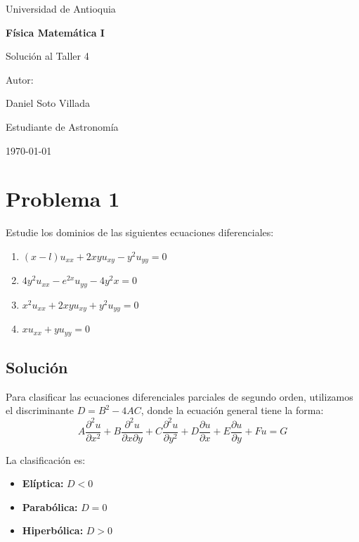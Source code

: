\documentclass[a4paper]{article}
\begin{document}
\begin{titlepage}
  \centering
  {\Large Universidad de Antioquia\par}
  \vspace{2cm}
  {\huge\bfseries Física Matemática I\par}
  \vspace{0.4cm}
  {\Large Solución al Taller 4 \par}
  \vspace{2.5cm}
  {\large Autor:\par}
  \vspace{0.2cm}
  {\large Daniel Soto Villada\par}
  {\large Estudiante de Astronomía\par}
  \vfill
  {\large \today\par}
\end{titlepage}

\newpage
\tableofcontents
\newpage

\section{Problema 1}
Estudie los dominios de las siguientes ecuaciones diferenciales:
\begin{enumerate}
    \item $(x - l)u_{xx} + 2xyu_{xy} - y^2u_{yy} = 0$
    \item $4y^2u_{xx} - e^{2x}u_{yy} - 4y^2x = 0$
    \item $x^2u_{xx} + 2xyu_{xy} + y^2u_{yy} = 0$
    \item $xu_{xx} + yu_{yy} = 0$
\end{enumerate}

\subsection{Solución}

Para clasificar las ecuaciones diferenciales parciales de segundo orden, utilizamos el discriminante $D = B^2 - 4AC$, donde la ecuación general tiene la forma:
\begin{equation}
A\frac{\partial^2 u}{\partial x^2} + B\frac{\partial^2 u}{\partial x \partial y} + C\frac{\partial^2 u}{\partial y^2} + D\frac{\partial u}{\partial x} + E\frac{\partial u}{\partial y} + Fu = G
\end{equation}

La clasificación es:
\begin{itemize}
    \item \textbf{Elíptica:} $D < 0$
    \item \textbf{Parabólica:} $D = 0$
    \item \textbf{Hiperbólica:} $D > 0$
\end{itemize}
\end{document}
